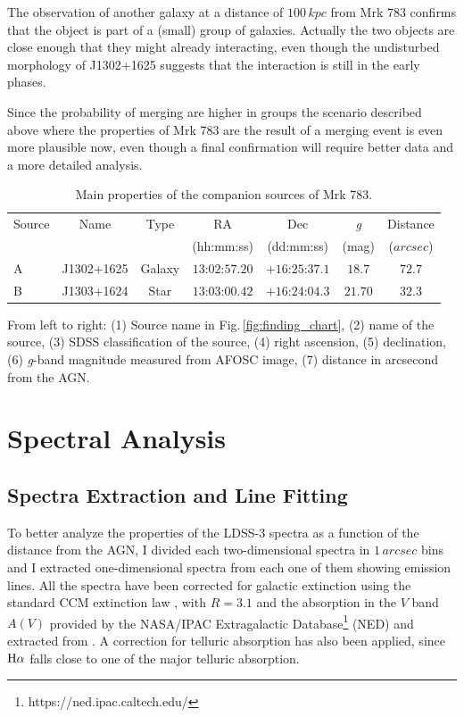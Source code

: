 \documentclass[../main.tex]{subfiles}
\begin{document}
The observation of another galaxy at a distance of $100\,\si{kpc}$ from Mrk 783 confirms that the object is part of a (small) group of galaxies.
Actually the two objects are close enough that they might already interacting, even though the undisturbed morphology of J1302+1625 suggests that the interaction is still in the early phases.

Since the probability of merging are higher in groups \citep{Kampczyk13} the scenario described above where the properties of Mrk 783 are the result of a merging event is even more plausible now, even though a final confirmation will require better data and a more detailed analysis.

\begin{table}
    \centering
    \caption{Main properties of the companion sources of Mrk 783.}
    \label{tab:companions}
    \begin{threeparttable}
    \begin{tabular}{lcccccc}
    \hline
    \hline
    Source& Name & Type& RA & Dec & \emph{g}& Distance\\
          &      &     & (hh:mm:ss)&(dd:mm:ss)& (mag) &($\si{arcsec}$)\\
    \hline
    A &J1302+1625&Galaxy &$13$:$02$:$57.20$&$+16$:$25$:$37.1$&$18.7$&$72.7$\\
    B &J1303+1624&Star &$13$:$03$:$00.42$&$+16$:$24$:$04.3$&$21.70$&$32.3$\\
    \hline
    \end{tabular}
    \begin{tablenotes}
    \item From left to right: (1) Source name in Fig.\,\ref{fig:finding_chart}, (2) name of the source, (3) SDSS classification of the source, (4) right ascension, (5) declination, (6) \emph{g}-band magnitude measured from AFOSC image, (7) distance in arcsecond from the AGN.
    \end{tablenotes}
    \end{threeparttable}
\end{table}


\section{Spectral Analysis}
\label{sec:spectral_anal}

\subsection{Spectra Extraction and Line Fitting}
\label{sec:extraction}
To better analyze the properties of the LDSS-3 spectra as a function of the distance from the AGN, I divided each two-dimensional spectra in $1\,\si{arcsec}$ bins and I extracted one-dimensional spectra from each one of them showing emission lines.
All the spectra have been corrected for galactic extinction using the standard CCM extinction law \citep{Cardelli89}, with $R = 3.1$ and the absorption in the $V$ band $A(V)$ provided by the NASA/IPAC Extragalactic Database\footnote{https://ned.ipac.caltech.edu/} (NED) and extracted from \citet{Schlafly11}.
A correction for telluric absorption has also been applied, since $\rm H\alpha$ falls close to one of the major telluric absorption.
\end{document}

